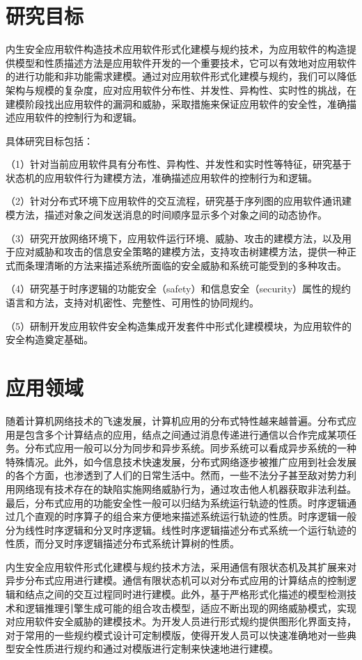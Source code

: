 \section{研究目标}
\par
内生安全应用软件构造技术应用软件形式化建模与规约技术，为应用软件的构造提供模型和性质描述方法是应用软件开发的一个重要技术，它可以有效地对应用软件的进行功能和非功能需求建模。通过对应用软件形式化建模与规约，我们可以降低架构与规模的复杂度，应对应用软件分布性、并发性、异构性、实时性的挑战，在建模阶段找出应用软件的漏洞和威胁，采取措施来保证应用软件的安全性，准确描述应用软件的控制行为和逻辑。
\par
具体研究目标包括：
\par
（1）针对当前应用软件具有分布性、异构性、并发性和实时性等特征，研究基于状态机的应用软件行为建模方法，准确描述应用软件的控制行为和逻辑。
\par
（2）针对分布式环境下应用软件的交互流程，研究基于序列图的应用软件通讯建模方法，描述对象之间发送消息的时间顺序显示多个对象之间的动态协作。
\par
（3）研究开放网络环境下，应用软件运行环境、威胁、攻击的建模方法，以及用于应对威胁和攻击的信息安全策略的建模方法，支持攻击树建模方法，提供一种正式而条理清晰的方法来描述系统所面临的安全威胁和系统可能受到的多种攻击。
\par
（4）研究基于时序逻辑的功能安全（safety）和信息安全（security）属性的规约语言和方法，支持对机密性、完整性、可用性的协同规约。
\par
（5）研制开发应用软件安全构造集成开发套件中形式化建模模块，为应用软件的安全构造奠定基础。
\section{应用领域}
\par
随着计算机网络技术的飞速发展，计算机应用的分布式特性越来越普遍。分布式应用是包含多个计算结点的应用，结点之间通过消息传递进行通信以合作完成某项任务。分布式应用一般可以分为同步和异步系统。同步系统可以看成异步系统的一种特殊情况。此外，如今信息技术快速发展，分布式网络逐步被推广应用到社会发展的各个方面，也渗透到了人们的日常生活中。然而，一些不法分子甚至敌对势力利用网络现有技术存在的缺陷实施网络威胁行为，通过攻击他人机器获取非法利益。最后，分布式应用的功能安全性一般可以归结为系统运行轨迹的性质。时序逻辑通过几个直观的时序算子的组合来方便地来描述系统运行轨迹的性质。时序逻辑一般分为线性时序逻辑和分叉时序逻辑。线性时序逻辑描述分布式系统一个运行轨迹的性质，而分叉时序逻辑描述分布式系统计算树的性质。
\par
内生安全应用软件形式化建模与规约技术方法，采用通信有限状态机及其扩展来对异步分布式应用进行建模。通信有限状态机可以对分布式应用的计算结点的控制逻辑和结点之间的交互过程同时进行建模。此外，基于严格形式化描述的模型检测技术和逻辑推理引擎生成可能的组合攻击模型，适应不断出现的网络威胁模式，实现对应用软件安全威胁的建模技术。为开发人员进行形式规约提供图形化界面支持，对于常用的一些规约模式设计可定制模版，使得开发人员可以快速准确地对一些典型安全性质进行规约和通过对模版进行定制来快速地进行建模。